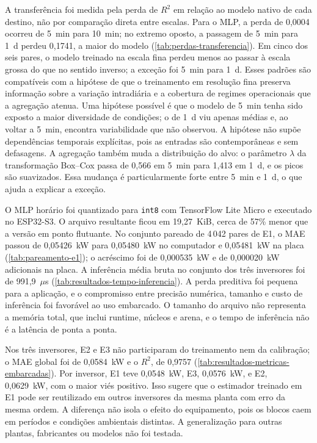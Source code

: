 A transferência foi medida pela perda de $R^2$ em relação ao modelo nativo de
cada destino, não por comparação direta entre escalas. Para o MLP, a perda de
0,0004 ocorreu de 5~min para 10~min; no extremo oposto, a passagem de 5~min para
1~d perdeu 0,1741, a maior do modelo (\cref{tab:perdas-transferencia}). Em cinco
dos seis pares, o modelo treinado na escala fina perdeu menos ao passar à escala
grossa do que no sentido inverso; a exceção foi 5~min para 1~d. Esses padrões são
compatíveis com a hipótese de que o treinamento em resolução fina preserva
informação sobre a variação intradiária e a cobertura de regimes operacionais que
a agregação atenua. Uma hipótese possível é que o modelo de 5~min tenha sido
exposto a maior diversidade de condições; o de 1~d viu apenas médias e, ao voltar
a 5~min, encontra variabilidade que não observou. A hipótese não supõe
dependências temporais explícitas, pois as entradas são contemporâneas e sem
defasagens. A agregação também muda a distribuição do alvo: o parâmetro $\lambda$
da transformação Box--Cox passa de 0,566 em 5~min para 1,413 em 1~d, e os picos
são suavizados. Essa mudança é particularmente forte entre 5~min e 1~d, o que
ajuda a explicar a exceção.

O MLP horário foi quantizado para \texttt{int8} com TensorFlow Lite Micro e
executado no ESP32-S3. O arquivo resultante ficou em 19,27~KiB, cerca de 57\%
menor que a versão em ponto flutuante. No conjunto pareado de 4\,042 pares de E1,
o MAE passou de 0,05426~kW para 0,05480~kW no computador e 0,05481~kW na placa
(\cref{tab:pareamento-e1}); o acréscimo foi de 0,000535~kW e de 0,000020~kW
adicionais na placa. A inferência média bruta no conjunto dos três inversores
foi de 991,9~$\mu$s (\cref{tab:resultados-tempo-inferencia}). A perda preditiva foi pequena para a
aplicação, e o compromisso entre precisão numérica, tamanho e custo de inferência
foi favorável ao uso embarcado. O tamanho do arquivo não representa a memória
total, que inclui runtime, núcleos e arena, e o tempo de inferência não é a
latência de ponta a ponta.

Nos três inversores, E2 e E3 não participaram do treinamento nem da calibração; o
MAE global foi de 0,0584~kW e o $R^2$, de 0,9757
(\cref{tab:resultados-metricas-embarcadas}). Por inversor, E1 teve 0,0548~kW, E3,
0,0576~kW, e E2, 0,0629~kW, com o maior viés positivo. Isso sugere que o estimador
treinado em E1 pode ser reutilizado em outros inversores da mesma planta com erro
da mesma ordem. A diferença não isola o efeito do equipamento, pois os blocos
caem em períodos e condições ambientais distintas. A generalização para outras
plantas, fabricantes ou modelos não foi testada.


